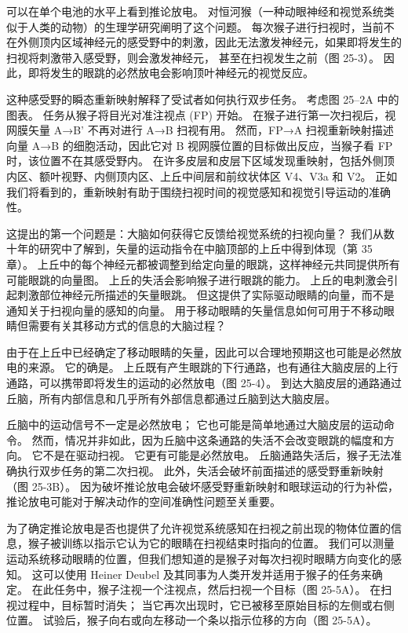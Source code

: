 可以在单个电池的水平上看到推论放电。 对恒河猴（一种动眼神经和视觉系统类似于人类的动物）的生理学研究阐明了这个问题。 每次猴子进行扫视时，当前不在外侧顶内区域神经元的感受野中的刺激，因此无法激发神经元，如果即将发生的扫视将刺激带入感受野，则会激发神经元， 甚至在扫视发生之前（图 25-3）。 因此，即将发生的眼跳的必然放电会影响顶叶神经元的视觉反应。

这种感受野的瞬态重新映射解释了受试者如何执行双步任务。 考虑图 25–2A 中的图表。 任务从猴子将目光对准注视点 (FP) 开始。 在猴子进行第一次扫视后，视网膜矢量 A→B' 不再对进行 A→B 扫视有用。 然而，FP→A 扫视重新映射描述向量 A→B 的细胞活动，因此它对 B 视网膜位置的目标做出反应，当猴子看 FP 时，该位置不在其感受野内。 在许多皮层和皮层下区域发现重映射，包括外侧顶内区、额叶视野、内侧顶内区、上丘中间层和前纹状体区 V4、V3a 和 V2。 正如我们将看到的，重新映射有助于围绕扫视时间的视觉感知和视觉引导运动的准确性。

这提出的第一个问题是：大脑如何获得它反馈给视觉系统的扫视向量？ 我们从数十年的研究中了解到，矢量的运动指令在中脑顶部的上丘中得到体现（第 35 章）。 上丘中的每个神经元都被调整到给定向量的眼跳，这样神经元共同提供所有可能眼跳的向量图。 上丘的失活会影响猴子进行眼跳的能力。 上丘的电刺激会引起刺激部位神经元所描述的矢量眼跳。 但这提供了实际驱动眼睛的向量，而不是通知关于扫视向量的感知的向量。 用于移动眼睛的矢量信息如何可用于不移动眼睛但需要有关其移动方式的信息的大脑过程？

由于在上丘中已经确定了移动眼睛的矢量，因此可以合理地预期这也可能是必然放电的来源。 它的确是。 上丘既有产生眼跳的下行通路，也有通往大脑皮层的上行通路，可以携带即将发生的运动的必然放电（图 25-4）。 到达大脑皮层的通路通过丘脑，所有内部信息和几乎所有外部信息都通过丘脑到达大脑皮层。

丘脑中的运动信号不一定是必然放电； 它也可能是简单地通过大脑皮层的运动命令。 然而，情况并非如此，因为丘脑中这条通路的失活不会改变眼跳的幅度和方向。 它不是在驱动扫视。 它更有可能是必然放电。 丘脑通路失活后，猴子无法准确执行双步任务的第二次扫视。 此外，失活会破坏前面描述的感受野重新映射（图 25-3B）。 因为破坏推论放电会破坏感受野重新映射和眼球运动的行为补偿，推论放电可能对于解决动作的空间准确性问题至关重要。

为了确定推论放电是否也提供了允许视觉系统感知在扫视之前出现的物体位置的信息，猴子被训练以指示它认为它的眼睛在扫视结束时指向的位置。 我们可以测量运动系统移动眼睛的位置，但我们想知道的是猴子对每次扫视时眼睛方向变化的感知。 这可以使用 Heiner Deubel 及其同事为人类开发并适用于猴子的任务来确定。 在此任务中，猴子注视一个注视点，然后扫视一个目标（图 25-5A）。 在扫视过程中，目标暂时消失； 当它再次出现时，它已被移至原始目标的左侧或右侧位置。 试验后，猴子向右或向左移动一个条以指示位移的方向（图 25-5A）。

